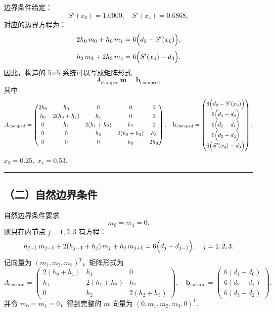 \documentclass[11pt]{article}
\begin{document}
边界条件给定： \[
S'(x_0)=1.0000,\quad S'(x_4)=0.6868,
\] 对应的边界方程为： \[
\begin{aligned}
2h_0\,m_0 + h_0\,m_1 &= 6\Bigl(d_0-S'(x_0)\Bigr),\\[1mm]
h_3\,m_3 + 2h_3\,m_4 &= 6\Bigl(S'(x_4)-d_3\Bigr).
\end{aligned}
\] 因此，构造的 5×5 系统可以写成矩阵形式 \[
A_{\text{clamped}}\,\mathbf{m} = \mathbf{b}_{\text{clamped}},
\] 其中 \[
A_{\text{clamped}}=
\begin{pmatrix}
2h_0 & h_0 & 0    & 0    & 0\\[1mm]
h_0  & 2(h_0+h_1) & h_1 & 0    & 0\\[1mm]
0    & h_1  & 2(h_1+h_2) & h_2 & 0\\[1mm]
0    & 0    & h_2  & 2(h_2+h_3) & h_3\\[1mm]
0    & 0    & 0    & h_3  & 2h_3
\end{pmatrix},\quad
\mathbf{b}_{\text{clamped}}=
\begin{pmatrix}
6\Bigl(d_0- S'(x_0)\Bigr)\\[1mm]
6\Bigl(d_1-d_0\Bigr)\\[1mm]
6\Bigl(d_2-d_1\Bigr)\\[1mm]
6\Bigl(d_3-d_2\Bigr)\\[1mm]
6\Bigl(S'(x_4)-d_3\Bigr)
\end{pmatrix}.
\] \(x_0=0.25,\; x_4=0.53\).

\begin{center}\rule{0.5\linewidth}{0.5pt}\end{center}

\subsection{（二）自然边界条件}\label{ux4e8cux81eaux7136ux8fb9ux754cux6761ux4ef6}

自然边界条件要求 \[
m_0 = m_4 = 0.
\] 则只在内节点 \(j=1,2,3\) 有方程： \[
h_{j-1}\,m_{j-1}+2(h_{j-1}+h_j)\,m_j+h_j\,m_{j+1}=6\Bigl(d_j-d_{j-1}\Bigr),\quad j=1,2,3.
\] 记向量为 \((m_1, m_2, m_3)^T\)，矩阵形式为 \[
A_{\text{natural}}=
\begin{pmatrix}
2(h_0+h_1) & h_1   & 0\\[1mm]
h_1        & 2(h_1+h_2) & h_2\\[1mm]
0          & h_2   & 2(h_2+h_3)
\end{pmatrix},\quad
\mathbf{b}_{\text{natural}}=
\begin{pmatrix}
6(d_1-d_0)\\[1mm]
6(d_2-d_1)\\[1mm]
6(d_3-d_2)
\end{pmatrix}.
\] 并令 \(m_0=m_4=0\)，得到完整的 \(m\) 向量为
\((0, m_1, m_2, m_3, 0)^T\).
\end{document}
